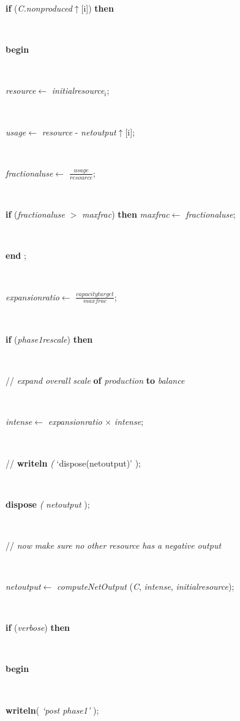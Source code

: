 \begin{tabbing}
\+\parbox{14cm}{\textsf {\textbf {if } \textsf{(\textit{C.nonproduced}$\uparrow$\textit{}[i])} \textbf{ then } }}\\
\<\parbox{14cm}{\textsf{\textbf{begin} }}\\
\parbox{14cm}{\textsf{\textit{resource}$\leftarrow$ \textit{initialresource}$_{\textit{i}}$}; }\\
\parbox{14cm}{\textsf{\textit{usage}$\leftarrow$ \textit{resource} - \textit{netoutput}$\uparrow$\textit{}[i]}; }\\
\parbox{14cm}{\textsf{\textit{fractionaluse}$\leftarrow$ $\frac{\textit{usage}}{\textit{resource}}$}; }\\
\parbox{14cm}{\textsf {\textbf {if } \textsf{(\textit{fractionaluse} $>$ \textit{maxfrac})} \textbf{ then } \textsf{\textit{maxfrac}$\leftarrow$ \textit{fractionaluse}}; }}\\
\<\-\parbox{14cm}{\textsf{\textbf{end} ;}}\\
\parbox{14cm}{\textsf{\textit{expansionratio}$\leftarrow$ $\frac{\textit{capacitytarget}}{\textit{maxfrac}}$}; }\\
\+\parbox{14cm}{\textsf {\textbf {if } \textsf{(\textit{phase1rescale})} \textbf{ then } }}\\
\parbox{14cm}{\textsf{// \textit{expand}  \textit{overall}  \textit{scale}  \textbf{of}  \textit{production}  \textbf{to}  \textit{balance} }}\\
\-\-\parbox{14cm}{\textsf{\textit{intense}$\leftarrow$ \textit{expansionratio} $\times$ \textit{intense}}; }\\
\parbox{14cm}{\textsf{// \textbf{writeln} \textit{(} \textrm{\textup { `dispose(netoutput)' } });}}\\
\parbox{14cm}{\textsf{\textbf{dispose} \textit{(} \textit{netoutput} );}}\\
\parbox{14cm}{\textsf{// \textit{now}  \textit{make}  \textit{sure}  \textit{no}  \textit{other}  \textit{resource}  \textit{has}  \textit{a}  \textit{negative}  \textit{output} }}\\
\parbox{14cm}{\textsf{\textit{netoutput}$\leftarrow$ \textit{computeNetOutput} (\textit{C}, \textit{intense}, \textit{initialresource})}; }\\
\+\parbox{14cm}{\textsf {\textbf {if } \textsf{(\textit{verbose})} \textbf{ then } }}\\
\<\parbox{14cm}{\textsf{\textbf{begin} }}\\
\parbox{14cm}{\textsf{\textbf{writeln}(\textit{\textrm{\textup { `post phase1' } }})}; }\\

\end{tabbing}
